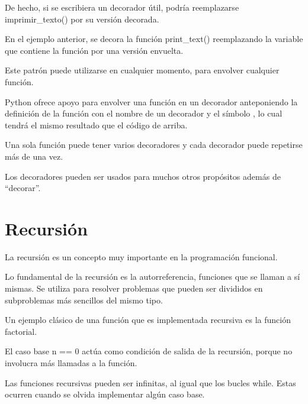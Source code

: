 \documentclass{report}
\newcommand{\doble}[1]{``#1''}
\begin{document}
De hecho, si se escribiera un decorador útil, podría reemplazarse imprimir\_texto() por su versión decorada.


En el ejemplo anterior, se decora la función print\_text() reemplazando la variable que contiene la función por una versión envuelta.


Este patrón puede utilizarse en cualquier momento, para envolver cualquier función.\smallskip

Python ofrece apoyo para envolver una función en un decorador anteponiendo la definición de la función con el nombre de un decorador y el símbolo \@, lo cual tendrá el mismo resultado que el código de arriba.


Una sola función puede tener varios decoradores y cada decorador puede repetirse más de una vez.


Los decoradores pueden ser usados para muchos otros propósitos además de \doble{decorar}.



\section{Recursión}

La recursión es un concepto muy importante en la programación funcional.\smallskip

Lo fundamental de la recursión es la autorreferencia, funciones que se llaman a sí mismas. Se utiliza para resolver problemas que pueden ser divididos en subproblemas más sencillos del mismo tipo.\smallskip

Un ejemplo clásico de una función que es implementada recursiva es la función factorial.


El caso base n == 0 actúa como condición de salida de la recursión, porque no involucra más llamadas a la función.\smallskip

Las funciones recursivas pueden ser infinitas, al igual que los bucles while. Estas ocurren cuando se olvida implementar algún caso base.\smallskip
\end{document}
